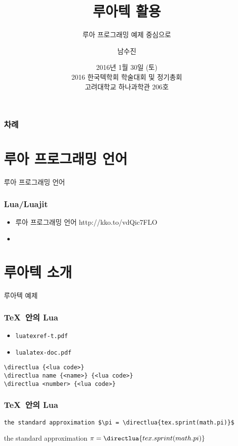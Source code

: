 \documentclass{beamer}
\title{루아텍 활용}
\subtitle{루아 프로그래밍 예제 중심으로}
\author{남수진}
\date{ 2016년 1월 30일 (토)\\
  2016 한국텍학회 학술대회 및 정기총회 \\
  {\small 고려대학교 하나과학관 206호}}
\begin{document}
\begin{frame}
  \titlepage
\end{frame}

\begin{frame}[t]
  \frametitle{차례}
  \tableofcontents
\end{frame}

%
\section{루아 프로그래밍 언어}

\begin{frame}
  \huge
  \centering 루아 프로그래밍 언어
\end{frame}

\begin{frame}
  \frametitle{Lua/Luajit}
  \begin{itemize}
  \item 루아 프로그래밍 언어 http://kko.to/vdQic7FLO
  \item
  \end{itemize}
\end{frame}


%
\section{루아텍 소개}

\begin{frame}
  \huge
  \centering 루아텍 예제
\end{frame}

\begin{frame}[fragile]
  \frametitle{\TeX\ 안의 Lua}
  \begin{itemize}
  \item \texttt{luatexref-t.pdf}
  \item \texttt{lualatex-doc.pdf}
  \end{itemize}
  \Large
\begin{verbatim}
\directlua {<lua code>}
\directlua name {<name>} {<lua code>}
\directlua <number> {<lua code>}
\end{verbatim}
\end{frame}

\begin{frame}[fragile]
  \frametitle{\TeX\ 안의 Lua}
\begin{verbatim}
the standard approximation $\pi = \directlua{tex.sprint(math.pi)}$
\end{verbatim}
\begin{center}
  the standard approximation $\pi = \directlua{tex.sprint(math.pi)}$
\end{center}
\end{frame}
\end{document}
